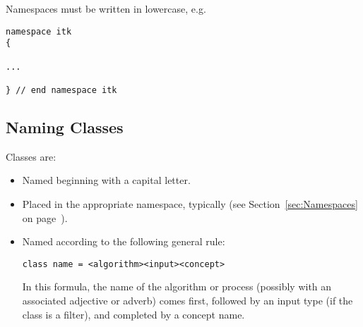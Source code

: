 Namespaces must be written in lowercase, e.g.

\small
\begin{verbatim}
namespace itk
{

...

} // end namespace itk
\end{verbatim}
\normalsize


\subsection{Naming Classes}
\label{subsec:NamingClasses}

Classes are:
\begin{itemize}
\item Named beginning with a capital letter.
\item Placed in the appropriate namespace, typically  (see
Section~\ref{sec:Namespaces} on page~\pageref{sec:Namespaces}).
\item Named according to the following general rule:

\small
\begin{verbatim}
class name = <algorithm><input><concept>
\end{verbatim}
\normalsize

In this formula, the name of the algorithm or process (possibly with an
associated adjective or adverb) comes first, followed by an input type (if the
class is a filter), and completed by a concept name.
\end{itemize}


